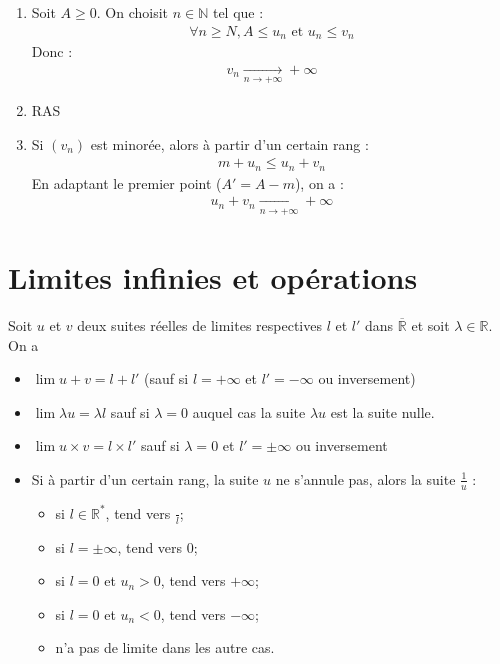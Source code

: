 \documentclass[../main.tex]{subfiles}
\begin{document}
\begin{enumerate}
    \item Soit $A \geq 0$. On choisit $n \in \mathbb{N}$ tel que : 
    \begin{align*}
        \forall n \geq N, A \leq u_n \text{ et } u_n \leq v_n
    \end{align*}
    Donc : 
    \begin{align*}
        \boxed{v_n \underset{n \to +\infty}{\longrightarrow} + \infty}
    \end{align*}

    \item RAS
    
    \item Si $(v_n)$ est minorée, alors à partir d'un certain rang : 
    \begin{align*}
        m + u_n \leq u_n + v_n
    \end{align*}
    En adaptant le premier point ($A' = A - m$), on a : 
    \begin{align*}
        \boxed{u_n + v_n \underset{n \to +\infty}{\longrightarrow} + \infty}
    \end{align*}
\end{enumerate}

\section{Limites infinies et opérations}
\begin{tcolorbox}[title=Théorème 14.49, title filled=false, colframe=orange, colback=orange!10!white]
    Soit $u$ et $v$ deux suites réelles de limites respectives $l$ et $l'$ dans $\overline{\mathbb{R}}$ et soit $\lambda \in \mathbb{R}$. On a 
    \begin{itemize}
        \item $\lim u + v = l + l'$ (sauf si $l = +\infty$ et $l' = -\infty$ ou inversement)
        \item $\lim \lambda u = \lambda l$ sauf si $\lambda = 0$ auquel cas la suite $\lambda u$ est la suite nulle. 
        \item $\lim u \times v = l \times l'$ sauf si $\lambda = 0$ et $l' = \pm \infty$ ou inversement
        \item Si à partir d'un certain rang, la suite $u$ ne s'annule pas, alors la suite $\frac{1}{u}$ : 
        \begin{itemize}
            \item si $l \in \mathbb{R}^*$, tend vers $\frac{}{l}$;
            \item si $l = \pm\infty$, tend vers $0$;
            \item si $l = 0$ et $u_n > 0$, tend vers $+\infty$;
            \item si $l = 0$ et $u_n < 0$, tend vers $-\infty$;
            \item n'a pas de limite dans les autre cas. 
        \end{itemize}
    \end{itemize}
\end{tcolorbox}
\end{document}
